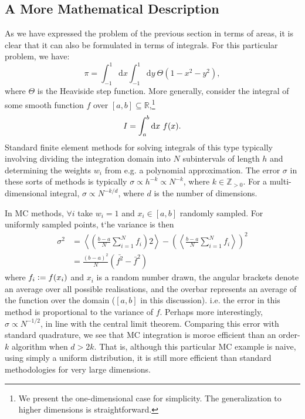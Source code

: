 \subsection{A More Mathematical Description}

As we have expressed the problem of the previous section in terms of areas, it is clear that it can also be formulated in terms of integrals. For this particular problem, we have:
\begin{equation}
    \pi = \int_{-1}^1  \mathrm{d}x \int_{-1}^1 \mathrm{d}y\ \Theta(1-x^2-y^2) ,
\end{equation}
where $\Theta$ is the Heaviside step function.
More generally, consider the integral of some smooth function $f$ over $[a,b]\subseteq \mathbb{R}$,\footnote{We present the one-dimensional case for simplicity. The generalization to higher dimensions is straightforward.}
\begin{equation}
    I = \int_a^b \mathrm{d} x \ f(x).
\end{equation}
Standard finite element methods for solving integrals of this type typically involving dividing the integration domain into $N$ subintervals of length $h$ and determining the weights $w_i$ from e.g. a polynomial approximation. The error $\sigma$ in these sorts of methods is typically $\sigma\propto h^{-k} \propto N^{-k}$, where $k\in\mathbb{Z}_{>0}$. For a multi-dimensional integral, $\sigma\propto N^{-k/d}$, where $d$ is the number of dimensions.\cite{ascherFirst2011}

In \gls{MC} methods, $\forall i$ take $w_i=1$ and $x_i\in[a,b]$ randomly sampled. For uniformly sampled points, t`he variance is then
\begin{align}
    \sigma^2 &= \left\langle \left( \frac{b-a}{N}\sum^N_{i=1}f_i\right)2\right\rangle - \left( \left\langle  \frac{b-a}{N}\sum^N_{i=1}f_i\right\rangle\right)^2 \\
    &= \frac{(b-a)^2}{N}(\bar{f^2} - \bar f^2)
\end{align}
where $f_i\mathrel{\mathop:}= f(x_i)$ and $x_i$ is a random number drawn, the angular brackets denote an average over all possible realisations, and the overbar represents an average of the function over the domain ($[a,b]$ in this discussion). i.e. the error in this method is proportional to the variance of $f$. Perhaps more interestingly, $\sigma\propto N^{-1/2}$, in line with the central limit theorem. Comparing this error with standard quadrature, we see that MC integration is moroe efficient than an order-$k$ algorithm when $d>2k$. That is, although this particular \gls{MC} example is naive, using simply a uniform distribution, it is still more efficient than standard methodologies for very large dimensions.

